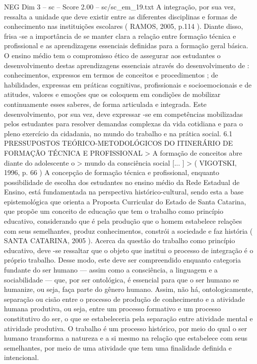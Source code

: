 \begin{textsample}{NEG Dim 3 – sc – Score 2.00 – sc/sc\_em\_19.txt}
A integração, por sua vez, ressalta a unidade que deve existir entre as diferentes disciplinas e formas de conhecimento nas instituições escolares ( RAMOS, 2005, p.114 ).
Diante disso, frisa -se a importância de se manter clara a relação entre formação técnica e profissional e as aprendizagens essenciais definidas para a formação geral básica.
O ensino médio tem o compromisso ético de assegurar aos estudantes o desenvolvimento destas aprendizagens essenciais através do desenvolvimento de : conhecimentos, expressos em termos de conceitos e procedimentos ; de habilidades, expressas em práticas cognitivas, profissionais e socioemocionais e de atitudes, valores e emoções que os coloquem em condições de mobilizar continuamente esses saberes, de forma articulada e integrada.
Este desenvolvimento, por sua vez, deve expressar -se em competências mobilizadas pelos estudantes para resolver demandas complexas da vida cotidiana e para o pleno exercício da cidadania, no mundo do trabalho e na prática social. 6.1 PRESSUPOSTOS TEÓRICO-METODOLÓGICOS DO ITINERÁRIO DE FORMAÇÃO TÉCNICA E PROFISSIONAL > A formação de conceitos abre diante do adolescente o > mundo da consciência social [... ] > ( VIGOTSKI, 1996, p. 66 ) A concepção de formação técnica e profissional, enquanto possibilidade de escolha dos estudantes no ensino médio da Rede Estadual de Ensino, está fundamentada na perspectiva histórico-cultural, sendo esta a base epistemológica que orienta a Proposta Curricular do Estado de Santa Catarina, que propõe um conceito de educação que tem o trabalho como princípio educativo, considerando que é pela produção que o homem estabelece relações com seus semelhantes, produz conhecimentos, constrói a sociedade e faz história ( SANTA CATARINA, 2005 ).
Acerca da questão do trabalho como princípio educativo, deve -se ressaltar que o objeto que institui o processo de integração é o próprio trabalho.
Desse modo, este deve ser compreendido enquanto categoria fundante do ser humano — assim como a consciência, a linguagem e a sociabilidade — que, por ser ontológica, é essencial para que o ser humano se humanize, ou seja, faça parte do gênero humano.
Assim, não há, ontologicamente, separação ou cisão entre o processo de produção de conhecimento e a atividade humana produtiva, ou seja, entre um processo formativo e um processo constitutivo do ser, o que se estabeleceria pela separação entre atividade mental e atividade produtiva.
O trabalho é um processo histórico, por meio do qual o ser humano transforma a natureza e a si mesmo na relação que estabelece com seus semelhantes, por meio de uma atividade que tem uma finalidade definida e intencional.

\end{textsample}

